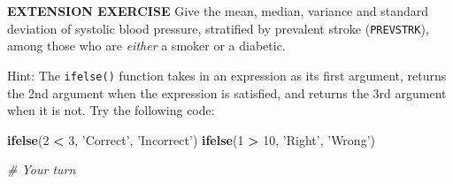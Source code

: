 \documentclass[
]{article}
\newenvironment{Shaded}{\begin{snugshade}}{\end{snugshade}}
\newcommand{\CommentTok}[1]{\textcolor[rgb]{0.56,0.35,0.01}{\textit{#1}}}
\newcommand{\DecValTok}[1]{\textcolor[rgb]{0.00,0.00,0.81}{#1}}
\newcommand{\KeywordTok}[1]{\textcolor[rgb]{0.13,0.29,0.53}{\textbf{#1}}}
\newcommand{\NormalTok}[1]{#1}
\newcommand{\OperatorTok}[1]{\textcolor[rgb]{0.81,0.36,0.00}{\textbf{#1}}}
\newcommand{\StringTok}[1]{\textcolor[rgb]{0.31,0.60,0.02}{#1}}
\begin{document}
\textbf{EXTENSION EXERCISE} Give the mean, median, variance and standard
deviation of systolic blood pressure, stratified by prevalent stroke
(\texttt{PREVSTRK}), among those who are \emph{either} a smoker or a
diabetic.

Hint: The \texttt{ifelse()} function takes in an expression as its first
argument, returns the 2nd argument when the expression is satisfied, and
returns the 3rd argument when it is not. Try the following code:

\begin{Shaded}
\begin{Highlighting}[]
\KeywordTok{ifelse}\NormalTok{(}\DecValTok{2} \OperatorTok{<}\StringTok{ }\DecValTok{3}\NormalTok{, }\StringTok{'Correct'}\NormalTok{, }\StringTok{'Incorrect'}\NormalTok{)}
\KeywordTok{ifelse}\NormalTok{(}\DecValTok{1} \OperatorTok{>}\StringTok{ }\DecValTok{10}\NormalTok{, }\StringTok{'Right'}\NormalTok{, }\StringTok{'Wrong'}\NormalTok{)}
\end{Highlighting}
\end{Shaded}

\begin{Shaded}
\begin{Highlighting}[]
\CommentTok{# Your turn}
\end{Highlighting}
\end{Shaded}
\end{document}
